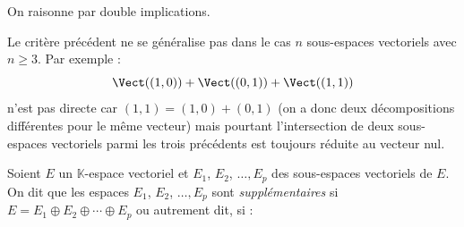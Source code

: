\documentclass[french,11pt,twoside]{VcCours}
\begin{document}
 \begin{Demonstration}{} On raisonne par double implications.
% 
% 
%

\vspace{8cm}

\end{Demonstration}

\begin{Remarque}{} Le critère précédent ne se généralise pas dans le cas $n$ sous-espaces vectoriels avec $n \geq 3$. Par exemple :
$$ \Vect((1,0)) + \Vect((0,1)) + \Vect((1,1)) $$
n'est pas directe car $(1,1)= (1,0) + (0,1)$ (on a donc deux décompositions différentes pour le même vecteur) mais pourtant l'intersection de deux sous-espaces vectoriels parmi les trois précédents est toujours réduite au vecteur nul.
\end{Remarque}


\begin{Definition}{}
Soient $E$ un $\mathbb{K}$-espace vectoriel et $E_1$, $E_2$, $\ldots, E_p$ des sous-espaces vectoriels de $E$.  On dit que les espaces $E_1$, $E_2$, $\ldots, E_p$ sont \emph{supplémentaires} si $E = E_1 \oplus E_2 \oplus \cdots \oplus E_p$ ou autrement dit, si :
\vspace{1cm}
\end{Definition}
\medskip
\end{document}

